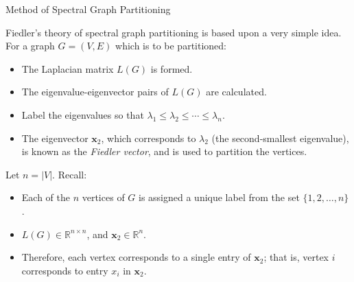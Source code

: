 \documentclass[aspectratio=169]{beamer}
\begin{document}
\begin{frame}{Method of Spectral Graph Partitioning}

Fiedler’s theory of spectral graph partitioning is based upon a very simple idea. For a graph \( G = (V, E) \) which is to be partitioned:

\begin{itemize}
    \item The Laplacian matrix \( L(G) \) is formed.
    \item The eigenvalue-eigenvector pairs of \( L(G) \) are calculated.
    \item Label the eigenvalues so that \( \lambda_1 \leq \lambda_2 \leq \cdots \leq \lambda_n \).
    \item The eigenvector \( \mathbf{x}_2 \), which corresponds to \( \lambda_2 \) (the second-smallest eigenvalue), is known as the \textit{Fiedler vector}, and is used to partition the vertices.
\end{itemize}

Let \( n = |V| \). Recall:

\begin{itemize}
    \item Each of the \( n \) vertices of \( G \) is assigned a unique label from the set \( \{1, 2, \ldots, n\} \).
    \item \( L(G) \in \mathbb{R}^{n \times n} \), and \( \mathbf{x}_2 \in \mathbb{R}^n \).
    \item Therefore, each vertex corresponds to a single entry of \( \mathbf{x}_2 \); that is, vertex \( i \) corresponds to entry \( x_i \) in \( \mathbf{x}_2 \).
\end{itemize}
\end{frame}
\end{document}
